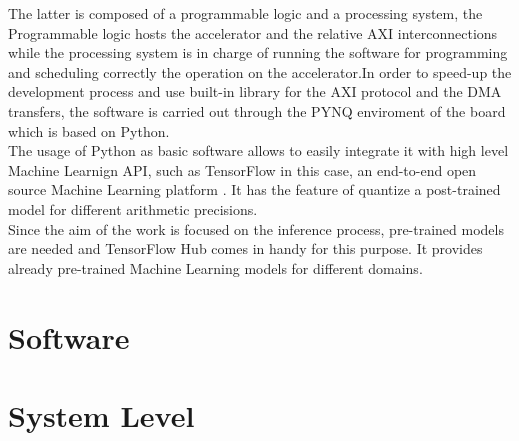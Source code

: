 The latter is composed of a programmable logic and a processing system, the Programmable logic hosts the accelerator and the relative AXI interconnections while the processing system is in charge of running the software for programming and  scheduling correctly the operation on the accelerator.\newline In order to speed-up the development process and use built-in library for the AXI protocol and the DMA transfers, the software is carried out through the PYNQ enviroment of the board \cite{WEBSITE:2} which is based on Python. \\
The usage of Python as basic software allows to easily integrate it with high level Machine Learnign API, such as TensorFlow in this case, an end-to-end open source Machine Learning platform \cite{WEBSITE:4}. It has the feature of quantize a post-trained model for different arithmetic precisions.\\
Since the aim of the work is focused on the inference process, pre-trained models are needed and TensorFlow Hub \cite{WEBSITE:5} comes in handy for this purpose. It provides already pre-trained Machine Learning models for different domains.



\section{Software}
\section{System Level}

